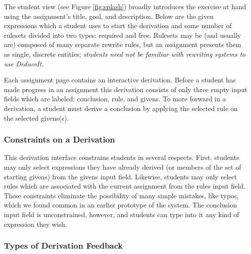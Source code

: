 \documentclass{sigchi}
\begin{document}
The student view (see Figure \ref{fig:splash}) broadly introduces the exercise at hand using the assignment's title, goal, and description. Below are the given expressions which a student uses to start the derivation and some number of rulesets divided into two types: required and free. Rulesets may be (and usually are) composed of many separate rewrite rules, but an assignment presents them as single, discrete entities; \textit{students need not be familiar with rewriting systems to use DeduceIt}. %

Each assignment page contains an interactive derivation. Before a student has made progress in an assignment this derivation consists of only three empty input fields which are labeled: conclusion, rule, and givens. To more forward in a derivation, a student must derive a conclusion by applying the selected rule on the selected givens(s). 

\subsubsection{Constraints on a Derivation}

This derivation interface constrains students in several respects. First, students may only select expressions they have already derived (or members of the set of starting givens) from the givens input field. Likewise, students may only select rules which are associated with the current assignment from the rules input field. These constraints eliminate the possibility of many simple mistakes, like typos, which we found common in an earlier prototype of the system. The conclusion input field is unconstrained, however, and students can type into it any kind of expression they wish.

\subsubsection{Types of Derivation Feedback}
\end{document}
